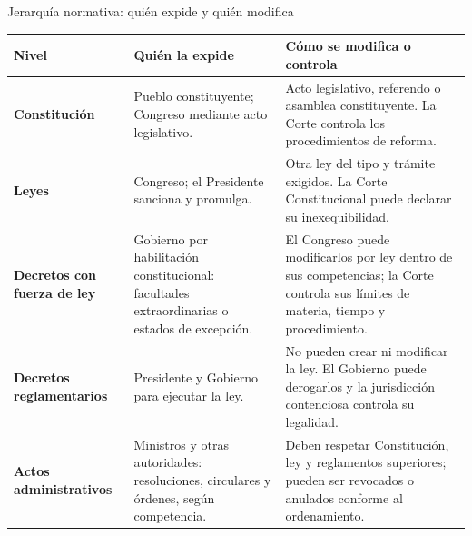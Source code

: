 \begin{frame}{Jerarqu\'ia normativa: qui\'en expide y qui\'en modifica}
\scriptsize
\begin{tabular}{p{}p{}p{}}
\textbf{Nivel} & \textbf{Qui\'en la expide} & \textbf{C\'omo se modifica o controla} \\ \hline
\textbf{Constituci\'on} &
Pueblo constituyente; Congreso mediante acto legislativo. &
Acto legislativo, referendo o asamblea constituyente. La Corte controla los procedimientos de reforma. \\[0.16cm]
\textbf{Leyes} &
Congreso; el Presidente sanciona y promulga. &
Otra ley del tipo y tr\'amite exigidos. La Corte Constitucional puede declarar su inexequibilidad. \\[0.16cm]
\textbf{Decretos con fuerza de ley} &
Gobierno por habilitaci\'on constitucional: facultades extraordinarias o estados de excepci\'on. &
El Congreso puede modificarlos por ley dentro de sus competencias; la Corte controla sus l\'imites de materia, tiempo y procedimiento. \\[0.16cm]
\textbf{Decretos reglamentarios} &
Presidente y Gobierno para ejecutar la ley. &
No pueden crear ni modificar la ley. El Gobierno puede derogarlos y la jurisdicci\'on contenciosa controla su legalidad. \\[0.16cm]
\textbf{Actos administrativos} &
Ministros y otras autoridades: resoluciones, circulares y \'ordenes, seg\'un competencia. &
Deben respetar Constituci\'on, ley y reglamentos superiores; pueden ser revocados o anulados conforme al ordenamiento. \\
\end{tabular}
\vspace{0.12cm}
\end{frame}

